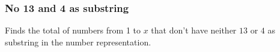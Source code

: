 \subsubsection{No 13 and 4 as substring}

Finds the total of numbers from 1 to $x$ that don't have neither $13$ or $4$ as substring in the number representation.


